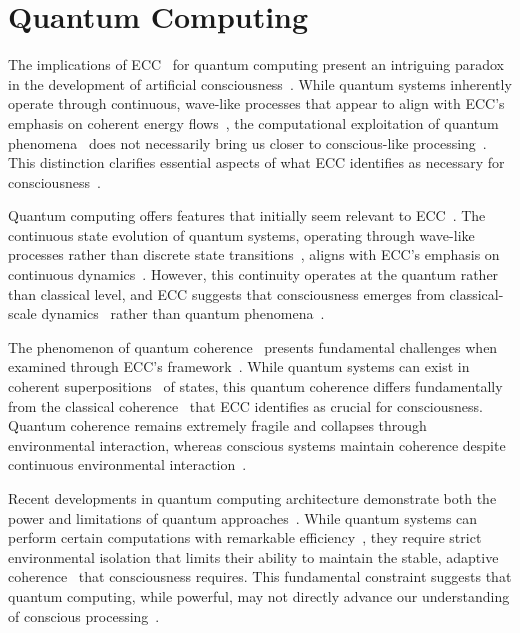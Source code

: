 \section{Quantum Computing}

 The implications of ECC~ for quantum computing present an intriguing paradox in the development of artificial consciousness~. While quantum systems inherently operate through continuous, wave-like processes that appear to align with ECC's emphasis on coherent energy flows~, the computational exploitation of quantum phenomena~ does not necessarily bring us closer to conscious-like processing~. This distinction clarifies essential aspects of what ECC identifies as necessary for consciousness~\cite{Arute2019,hunt2023fields}.

Quantum computing offers features that initially seem relevant to ECC~\cite{Bernstein2018,searle1980minds}. The continuous state evolution of quantum systems, operating through wave-like processes rather than discrete state transitions~, aligns with ECC's emphasis on continuous dynamics~. However, this continuity operates at the quantum rather than classical level, and ECC suggests that consciousness emerges from classical-scale dynamics~ rather than quantum phenomena~\cite{Deutsch2020,Freeman2006nonlinear}.

The phenomenon of quantum coherence~ presents fundamental challenges when examined through ECC's framework~\cite{DiVincenzo2019,mcfadden2020integrating}. While quantum systems can exist in coherent superpositions~ of states, this quantum coherence differs fundamentally from the classical coherence~ that ECC identifies as crucial for consciousness. Quantum coherence remains extremely fragile and collapses through environmental interaction, whereas conscious systems maintain coherence despite continuous environmental interaction~\cite{Harrow2020,hunt2024electromagnetic}.

Recent developments in quantum computing architecture demonstrate both the power and limitations of quantum approaches~\cite{Kitaev2018,hameroff2014consciousness}. While quantum systems can perform certain computations with remarkable efficiency~, they require strict environmental isolation that limits their ability to maintain the stable, adaptive coherence~ that consciousness requires. This fundamental constraint suggests that quantum computing, while powerful, may not directly advance our understanding of conscious processing~\cite{Montanaro2021,butlin2023consciousnessartificialintelligenceinsights}.

